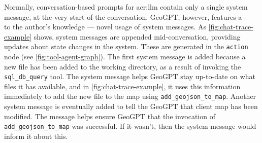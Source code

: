 Normally, conversation-based prompts for \acrshort{acr:llm} contain only a single system message, at the very start of the conversation. GeoGPT, however, features a --- to the author's knowledge --- novel usage of system messages. As \autoref{fig:chat-trace-example} shows, system messages are appended mid-conversation, providing updates about state changes in the system. These are generated in the \texttt{action} node (see \autoref{fig:tool-agent-graph}). The first system message is added because a new file has been added to the working directory, as a result of invoking the \texttt{sql\_db\_query} tool. The system message helps GeoGPT stay up-to-date on what files it has available, and in \autoref{fig:chat-trace-example}, it uses this information immediately to add the new file to the map using \texttt{add\_geojson\_to\_map}. Another system message is eventually added to tell the GeoGPT that client map has been modified. The message helps ensure GeoGPT that the invocation of \texttt{add\_geojson\_to\_map} was successful. If it wasn't, then the system message would inform it about this.

\glsresetall


